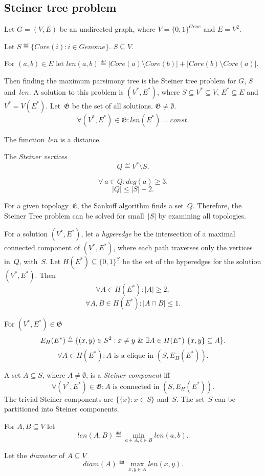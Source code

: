 \documentclass[10pt,a4paper]{article}
\theoremstyle{plain} \newtheorem{Lem}{Lemma}
\begin{document}
\subsection {Steiner tree problem}

Let $G = (V,E)$ be an undirected graph, where $V = \{0,1\}^{Gene}$ and $E = V^2$.

Let $S \eqdef \{Core(i): i \in Genome \}$. $S \subseteq V$.

For $(a,b) \in E$ let $len(a,b) \eqdef |Core(a) \setminus Core(b)| + |Core(b) \setminus Core(a)|$.

Then finding the maximum parsimony tree is the Steiner tree problem for $G$, $S$ and~$len$.
A solution to this problem is $(V^*, E^*)$, where $S \subseteq V^* \subseteq V$, $E^* \subseteq E$ and $V^* = V(E^*)$.
Let~$\mathfrak G$ be the set of all solutions. $\mathfrak G \ne \emptyset$.
$$ \forall (V^*,E^*) \in \mathfrak G : len(E^*) = const. $$

The function~$len$ is a distance.

The {\em Steiner vertices}
$$ Q \eqdef V^* \setminus S. $$

$$ \forall \ a \in Q : deg(a) \ge 3. $$
$$ |Q| \le |S| - 2. $$

For a given topology~$\mathfrak E$, the Sankoff algorithm finds a set~$Q$.
Therefore, the Steiner Tree problem can be solved for small~$|S|$ by examining all topologies.

For a solution $(V^*, E^*)$, let a {\em hyperedge} be the intersection of a maximal connected component of $(V^*, E^*)$, where each path traverses only the vertices in~$Q$, with~$S$.
Let $H(E^*) \subseteq \{0,1\}^S$ be the set of the hyperedges for the solution $(V^*, E^*)$.
Then
$$ \forall A \in H(E^*) : |A| \ge 2, $$
$$ \forall A,B \in H(E^*) : |A \cap B| \le 1. $$

For $(V^*, E^*) \in \mathfrak G$ 
$$ E_H(E^*) \triangleq \{(x,y) \in S^2 : x \ne y \ \& \  \exists A \in H(E^*) \ \{x,y\} \subseteq A\}. $$
$$ \forall A \in H(E^*) : A \text{ is a clique in } (S, E_H(E^*)). $$

A set $A \subseteq S$, where $A \ne \emptyset$, is a {\em Steiner component} iff
$$ \forall (V^*, E^*) \in \mathfrak G : A \text{ is connected in } (S, E_H(E^*)). $$
The trivial Steiner components are $\{\{x\}: x \in S\}$ and~$S$.
The set~$S$ can be partitioned into Steiner components.

For $A, B \subseteq V$ let
$$ len(A,B) \eqdef \min_{a \in A, b \in B} len(a,b). $$

Let the {\em diameter} of $A \subseteq V$ 
$$ diam(A) \eqdef \max_{x,y \in A} len(x,y). $$
\end{document}
